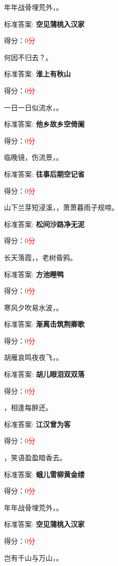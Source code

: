 \documentclass[12pt, a4paper, addpoints, answers]{exam}
\begin{document}
\begin{questions}
\question[3] 年年战骨埋荒外，\fillin 。

标准答案: \textbf{空见蒲桃入汉家}   

得分：\textcolor{red}{0分} 

\question[3] 何因不归去？\fillin 。

标准答案: \textbf{淮上有秋山}   

得分：\textcolor{red}{0分} 

\question[3] 一日一日似流水，\fillin 。

标准答案: \textbf{他乡故乡空倚阑}   

得分：\textcolor{red}{0分} 

\question[3] 临晚镜，伤流景，\fillin 。

标准答案: \textbf{往事后期空记省}   

得分：\textcolor{red}{0分} 

\question[3] 山下兰芽短浸溪，\fillin ，萧萧暮雨子规啼。

标准答案: \textbf{松间沙路净无泥}   

得分：\textcolor{red}{0分} 

\question[3] 长天落霞，\fillin ，老树昏鸦。

标准答案: \textbf{方池睡鸭}   

得分：\textcolor{red}{0分} 

\question[3] 寒风夕吹易水波，\fillin 。

标准答案: \textbf{渐离击筑荆卿歌}   

得分：\textcolor{red}{0分} 

\question[3] 胡雁哀鸣夜夜飞，\fillin 。

标准答案: \textbf{胡儿眼泪双双落}   

得分：\textcolor{red}{0分} 

\question[3] \fillin ，相逢每醉还。

标准答案: \textbf{江汉曾为客}   

得分：\textcolor{red}{0分} 

\question[3] \fillin ，笑语盈盈暗香去。

标准答案: \textbf{蛾儿雪柳黄金缕}   

得分：\textcolor{red}{0分} 

\question[3] 年年战骨埋荒外，\fillin 。

标准答案: \textbf{空见蒲桃入汉家}   

得分：\textcolor{red}{0分} 

\question[3] 岂有千山与万山，\fillin 。


\end{questions}
\end{document}

